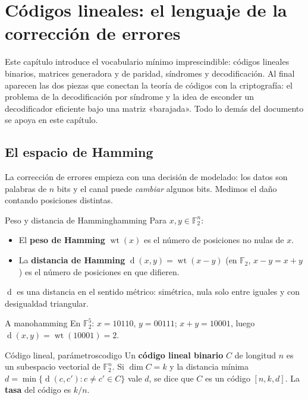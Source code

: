 \documentclass[11pt,a4paper,oneside]{report}
\newcommand{\F}{\mathbb{F}}
\newcommand{\wt}{\operatorname{wt}}
\newcommand{\dist}{\operatorname{d}}
\newcommand{\Ftwo}{\F_2}
\begin{document}
\chapter{Códigos lineales: el lenguaje de la corrección de errores}\label{ch:lineales}

\begin{roadmap}
Este capítulo introduce el vocabulario mínimo imprescindible: códigos
lineales binarios, matrices generadora y de paridad, síndromes y
decodificación. Al final aparecen las dos piezas que conectan la teoría de
códigos con la criptografía: el problema de la decodificación por síndrome
y la idea de esconder un decodificador eficiente bajo una matriz
«barajada». Todo lo demás del documento se apoya en este capítulo.
\end{roadmap}

\section{El espacio de Hamming}

La corrección de errores empieza con una decisión de modelado: los datos
son palabras de $n$ bits y el canal puede \emph{cambiar} algunos bits.
Medimos el daño contando posiciones distintas.

\begin{definicion}{Peso y distancia de Hamming}{hamming}
Para $x,y\in\Ftwo^n$:
\begin{itemize}[leftmargin=1.2em,itemsep=1pt]
  \item El \textbf{peso de Hamming} $\wt(x)$ es el número de posiciones no
        nulas de $x$.
  \item La \textbf{distancia de Hamming} $\dist(x,y)=\wt(x-y)$
        \textnormal{(}en $\Ftwo$, $x-y=x+y$\textnormal{)} es el número de
        posiciones en que difieren.
\end{itemize}
$\dist$ es una distancia en el sentido métrico: simétrica, nula solo
entre iguales y con desigualdad triangular.
\end{definicion}

\begin{ejemplo}{A mano}{hamming}
En $\Ftwo^5$: $x=10110$, $y=00111$; $x+y=10001$, luego
$\dist(x,y)=\wt(10001)=2$.
\end{ejemplo}

\begin{definicion}{Código lineal, parámetros}{codigo}
Un \textbf{código lineal binario} $C$ de longitud $n$ es un subespacio
vectorial de $\Ftwo^n$. Si $\dim C=k$ y la distancia mínima
$d=\min\{\dist(c,c')\colon c\neq c'\in C\}$ vale $d$, se dice que $C$ es un
código $[n,k,d]$. La \textbf{tasa} del código es $k/n$.
\end{definicion}
\end{document}

